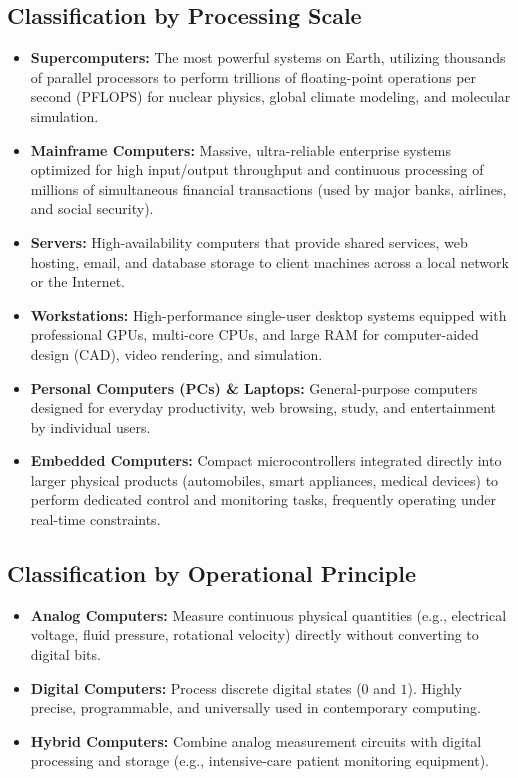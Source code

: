\subsection{Classification by Processing Scale}
\begin{itemize}[leftmargin=1.2em]
    \item \textbf{Supercomputers:} The most powerful systems on Earth, utilizing thousands of parallel processors to perform trillions of floating-point operations per second (PFLOPS) for nuclear physics, global climate modeling, and molecular simulation.
    \item \textbf{Mainframe Computers:} Massive, ultra-reliable enterprise systems optimized for high input/output throughput and continuous processing of millions of simultaneous financial transactions (used by major banks, airlines, and social security).
    \item \textbf{Servers:} High-availability computers that provide shared services, web hosting, email, and database storage to client machines across a local network or the Internet.
    \item \textbf{Workstations:} High-performance single-user desktop systems equipped with professional GPUs, multi-core CPUs, and large RAM for computer-aided design (CAD), video rendering, and simulation.
    \item \textbf{Personal Computers (PCs) \& Laptops:} General-purpose computers designed for everyday productivity, web browsing, study, and entertainment by individual users.
    \item \textbf{Embedded Computers:} Compact microcontrollers integrated directly into larger physical products (automobiles, smart appliances, medical devices) to perform dedicated control and monitoring tasks, frequently operating under real-time constraints.
\end{itemize}

\subsection{Classification by Operational Principle}
\begin{itemize}[leftmargin=1.2em]
    \item \textbf{Analog Computers:} Measure continuous physical quantities (e.g., electrical voltage, fluid pressure, rotational velocity) directly without converting to digital bits.
    \item \textbf{Digital Computers:} Process discrete digital states ($0$ and $1$). Highly precise, programmable, and universally used in contemporary computing.
    \item \textbf{Hybrid Computers:} Combine analog measurement circuits with digital processing and storage (e.g., intensive-care patient monitoring equipment).
\end{itemize}

